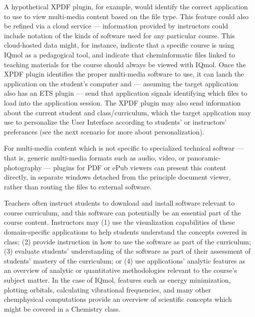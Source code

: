 \documentclass[10pt,letterpaper]{article}
\newcommand{\pseudoIndent}{

\vspace{1pt}\hspace{8pt}}
\newcommand{\sapp}{\resizebox{!}{8pt}{\AcronymText{Sapien+}}}
\newcommand{\textscc}[1]{{\color{orr!35!black}{{%
						\fontfamily{Cabin-TLF}\fontseries{b}\selectfont{\textsc{\scriptsize{#1}}}}}}}
\newcommand{\AcronymText}[1]{{\textscc{#1}}}
\begin{document}
{{\begin{description}
\pseudoIndent{} A hypothetical XPDF plugin, for example, 
would identify the correct application to use to view 
multi-media content based on the file type.  This feature 
could also be refined via a cloud service --- information 
provided by instructors could include notation of the 
kinds of software used for any particular course.  
This cloud-hosted data might, for instance, indicate 
that a specific course is using IQmol as a pedagogical 
tool, and indicate that cheminformatic files linked 
to teaching materials for the course should always be 
viewed with IQmol.  Once the XPDF plugin identifies 
the proper multi-media software to use, it can 
lanch the application on the student's computer and 
--- assuming the target application also has an ETS 
plugin --- send that application signals identifying 
which files to load into the application session.   
The XPDF plugin may also send 
information about the current student and 
class/curriculum, which the target application may use to 
personalize the User Interface according to students' 
or instructors' preferances (see the next scenario 
for more about personalization).

\pseudoIndent{} For multi-media content which is 
not specific to specialized technical softwar 
--- that is, generic multi-media formats such as 
audio, video, or panoramic-photography --- 
\sapp{} plugins for PDF or ePub viewers can present 
this content directly, in separate windows detached 
from the principle document viewer, rather than 
routing the files to external software.   

\item[Scenario 2: A student launches a scientific 
application which is used as a pedagogical tool]  
Teachers often instruct students to download 
and install software relevant to course curriculum, 
and this software can potentially be an essential 
part of the course content.  Instructors may 
(1) use the visualization capabilities of these 
domain-specific applications to help students 
understand the concepts covered in class; 
(2) provide instruction in how to use the 
software as part of the curriculum; 
(3) evaluate students' understanding of the 
software as part of their assessment of 
students' mastery of the curriculum; or 
(4) use applications' analytic features as an 
overview of analytic or quantitative methodologies 
relevant to the course's subject matter.  In 
the case of IQmol, features such as 
energy minimization, plotting orbitals, 
calculating vibrational frequencies, and many 
other chemphysical computations provide an 
overview of scientific concepts which 
might be covered in a Chemistry class. 
 

\end{description}}}
\end{document}

